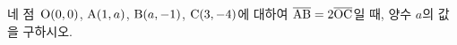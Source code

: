 네 점~$\mathrm{O}(0{,}\mkern3mu\mathopen{}0)$, $\mathrm{A}(1{,}\mkern3mu\mathopen{}a)$, $\mathrm{B}(a{,}\mkern3mu\mathopen{}-1)$, $\mathrm{C}(3{,}\mkern3mu\mathopen{}-4)$에 대하여 $\overline{\mathrm{AB}}=2\overline{\mathrm{OC}}$일 때, 양수 $a$의 값을 구하시오.
